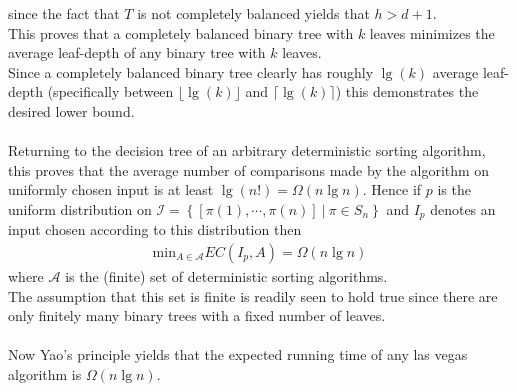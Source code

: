 \documentclass[11pt]{article}
\begin{document}
since the fact that $T$ is not completely balanced yields that $h > d+1$. \\
This proves that a completely balanced binary tree with $k$ leaves minimizes the average leaf-depth of any binary tree with $k$ leaves. \\
Since a completely balanced binary tree clearly has roughly $\lg(k)$ average leaf-depth
(specifically between $\lfloor \lg(k) \rfloor$ and $\lceil \lg(k) \rceil$)
this demonstrates the desired lower bound. \\ \\
Returning to the decision tree of an arbitrary deterministic sorting algorithm,
this proves that the average number of comparisons made by the algorithm on uniformly chosen input
is at least $\lg(n!)=\Omega(n \lg n)$. Hence if $p$ is the uniform distribution on
$\mathcal{I}=\left\{ \left[ \pi(1),\cdots,\pi(n) \right] \ | \ \pi \in S_n \right\}$
and $I_p$ denotes an input chosen according to this distribution then 
\begin{align*}
	\text{min}_{A \in \mathcal{A}}EC(I_p,A)=\Omega(n \lg n)
\end{align*}
where $\mathcal{A}$ is the (finite) set of deterministic sorting algorithms. \\
The assumption that this set is finite is readily seen to hold true
since there are only finitely many binary trees with a fixed number of leaves. \\ \\
Now Yao's principle yields that the expected running time of any las vegas algorithm is $\Omega(n \lg n)$.
\end{document}
